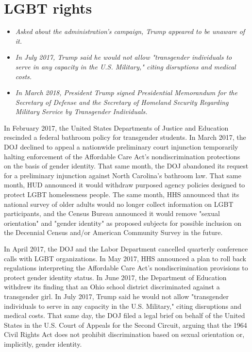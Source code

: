 \section{LGBT rights}\label{lgbt-rights}

\begin{itemize}
\item
  \emph{Asked about the administration's campaign, Trump appeared to be
  unaware of it.}
\item
  \emph{In July 2017, Trump said he would not allow "transgender
  individuals to serve in any capacity in the U.S. Military," citing
  disruptions and medical costs.}
\item
  \emph{In March 2018, President Trump signed Presidential Memorandum
  for the Secretary of Defense and the Secretary of Homeland Security
  Regarding Military Service by Transgender Individuals.}
\end{itemize}

In February 2017, the United States Departments of Justice and Education
rescinded a federal bathroom policy for transgender students. In March
2017, the DOJ declined to appeal a nationwide preliminary court
injunction temporarily halting enforcement of the Affordable Care Act's
nondiscrimination protections on the basis of gender identity. That same
month, the DOJ abandoned its request for a preliminary injunction
against North Carolina's bathroom law. That same month, HUD announced it
would withdraw purposed agency policies designed to protect LGBT
homelessness people. The same month, HHS announced that its national
survey of older adults would no longer collect information on LGBT
participants, and the Census Bureau announced it would remove "sexual
orientation" and "gender identity" as proposed subjects for possible
inclusion on the Decennial Census and/or American Community Survey in
the future.

In April 2017, the DOJ and the Labor Department cancelled quarterly
conference calls with LGBT organizations. In May 2017, HHS announced a
plan to roll back regulations interpreting the Affordable Care Act's
nondiscrimination provisions to protect gender identity status. In June
2017, the Department of Education withdrew its finding that an Ohio
school district discriminated against a transgender girl. In July 2017,
Trump said he would not allow "transgender individuals to serve in any
capacity in the U.S. Military," citing disruptions and medical costs.
That same day, the DOJ filed a legal brief on behalf of the United
States in the U.S. Court of Appeals for the Second Circuit, arguing that
the 1964 Civil Rights Act does not prohibit discrimination based on
sexual orientation or, implicitly, gender identity.

